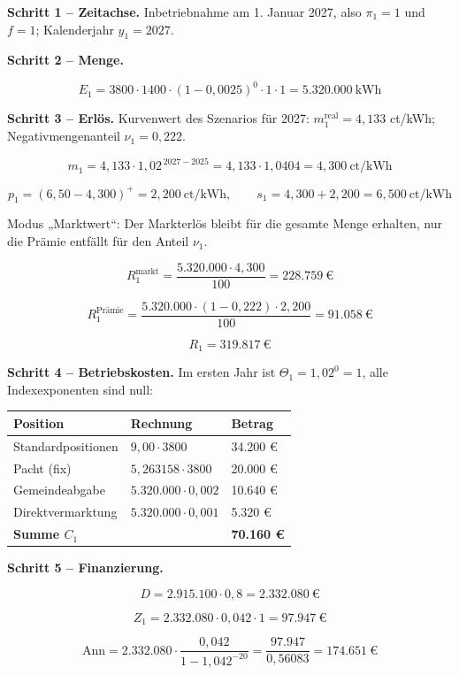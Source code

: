 \documentclass[
  a4paper,
  10pt]{article}
\begin{document}
\textbf{Schritt 1 -- Zeitachse.} Inbetriebnahme am 1. Januar 2027, also
\(\pi_1 = 1\) und \(f = 1\); Kalenderjahr \(y_1 = 2027\).

\textbf{Schritt 2 -- Menge.}

\[ E_1 = 3800 \cdot 1400 \cdot (1-0{,}0025)^0 \cdot 1 \cdot 1 = 5.320.000\ \mathrm{kWh} \]

\textbf{Schritt 3 -- Erlös.} Kurvenwert des Szenarios für 2027:
\(m^{\mathrm{real}}_1 = 4{,}133\) ct/kWh; Negativmengenanteil
\(\nu_1 = 0{,}222\).

\[ m_1 = 4{,}133 \cdot 1{,}02^{\,2027-2025} = 4{,}133 \cdot 1{,}0404 = 4{,}300\ \text{ct/kWh} \]

\[ p_1 = (6{,}50 - 4{,}300)^{+} = 2{,}200\ \text{ct/kWh}, \qquad s_1 = 4{,}300 + 2{,}200 = 6{,}500\ \text{ct/kWh} \]

Modus „Marktwert``: Der Markterlös bleibt für die gesamte Menge
erhalten, nur die Prämie entfällt für den Anteil \(\nu_1\).

\[ R^{\mathrm{markt}}_1 = \frac{5.320.000 \cdot 4{,}300}{100} = 228.759\ \text{€} \]

\[ R^{\text{Prämie}}_1 = \frac{5.320.000 \cdot (1 - 0{,}222) \cdot 2{,}200}{100} = 91.058\ \text{€} \]

\[ R_1 = 319.817\ \text{€} \]

\textbf{Schritt 4 -- Betriebskosten.} Im ersten Jahr ist
\(\Theta_1 = 1{,}02^0 = 1\), alle Indexexponenten sind null:

\begin{longtable}[]{@{}lll@{}}
\toprule\noalign{}
Position & Rechnung & Betrag \\
\midrule\noalign{}
\endhead
\bottomrule\noalign{}
\endlastfoot
Standardpositionen & \(9{,}00 \cdot 3800\) & 34.200 € \\
Pacht (fix) & \(5{,}263158 \cdot 3800\) & 20.000 € \\
Gemeindeabgabe & \(5.320.000 \cdot 0{,}002\) & 10.640 € \\
Direktvermarktung & \(5.320.000 \cdot 0{,}001\) & 5.320 € \\
\textbf{Summe \(C_1\)} & & \textbf{70.160 €} \\
\end{longtable}

\textbf{Schritt 5 -- Finanzierung.}

\[ D = 2.915.100 \cdot 0{,}8 = 2.332.080\ \text{€} \]

\[ Z_1 = 2.332.080 \cdot 0{,}042 \cdot 1 = 97.947\ \text{€} \]

\[ \mathrm{Ann} = 2.332.080 \cdot \frac{0{,}042}{1 - 1{,}042^{-20}} = \frac{97.947}{0{,}56083} = 174.651\ \text{€} \]
\end{document}
